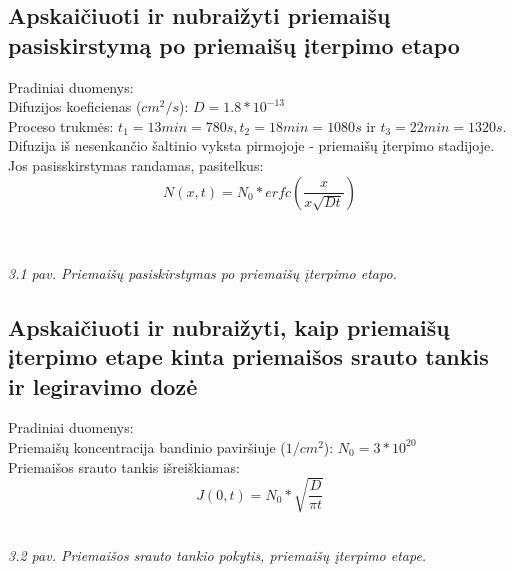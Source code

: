 \documentclass[11pt,a4paper]{article}
\begin{document}
\subsection{Apskaičiuoti ir nubraižyti priemaišų pasiskirstymą po priemaišų įterpimo etapo}
Pradiniai duomenys:\\
Difuzijos koeficienas ($cm^2/s$): $D = 1.8*10^{-13}$\\
Proceso trukmės: $t_1 = 13min = 780s, t_2 = 18min = 1080s$ ir $t_3 = 22min = 1320s$.\\
Difuzija iš nesenkančio šaltinio vyksta pirmojoje - priemaišų įterpimo stadijoje. Jos pasisskirstymas randamas, pasitelkus:
\begin{equation}
N(x,t) = N_0*erfc \left( \frac{x}{x\sqrt{Dt}} \right) 
\end{equation} \\
\\
\textsl{ 3.1 pav. Priemaišų pasiskirstymas po priemaišų įterpimo etapo.}\\

\subsection{Apskaičiuoti ir nubraižyti, kaip priemaišų įterpimo etape kinta priemaišos srauto tankis ir legiravimo dozė}
Pradiniai duomenys:\\
Priemaišų koncentracija bandinio paviršiuje ($1/cm^2$): $N_0 = 3*10^{20}$\\
Priemaišos srauto tankis išreiškiamas:\\
\begin{equation}
J(0,t) = N_0*\sqrt{\frac{D}{\pi t}}
\end{equation}
 \\
\textsl{3.2 pav. Priemaišos srauto tankio pokytis, priemaišų įterpimo etape.}\\
\end{document}
